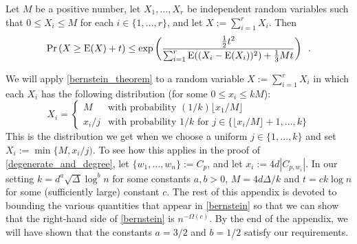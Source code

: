 \documentclass{patmorin}
\begin{document}
\begin{thm}\label{bernstein_theorem}
  Let $M$ be a positive number, let $X_1,\ldots,X_r$ be independent random variables such that $0\le X_i\le M$ for each $i\in\{1,\ldots,r\}$, and let $X:=\sum_{i=1}^r X_i$. Then
  \begin{equation}
    \Pr\left(X \ge \mathrm{E}(X)+ t\right)
      \le \exp\left(\frac{\tfrac{1}{2}t^2}{\sum_{i=1}^r \mathrm{E}((X_i-\mathrm{E}(X_i))^2)+\tfrac{1}{3}Mt}\right) \enspace . \label{bernstein}
  \end{equation}
\end{thm}
We will apply \cref{bernstein_theorem} to a random variable $X:=\sum_{i=1}^r X_i$ in which each $X_i$ has the following distribution (for some $0\le x_i\le kM$):
\[
  X_i = \begin{cases}
          M & \text{with probability $(1/k)\lfloor x_1/M\rfloor$} \\
          x_i/j & \text{with probability $1/k$ for $j\in\{\lfloor x_i/M\rfloor+1,\ldots,k\}$}
        \end{cases}
\]
This is the distribution we get when we choose a uniform $j\in\{1,\ldots,k\}$ and set $X_i:=\min\{M,x_i/j)$.  To see how this applies in the proof of \cref{degenerate_and_degree}, let $\{w_1,\ldots,w_n\}:=C_p$, and let $x_i:=4d|C_{p,w_i}|$.  In our setting $k=d^a\sqrt{\Delta}\log^b n$ for some constants $a,b>0$, $M=4d\Delta/k$ and $t=ck\log n$ for some (sufficiently large) constant $c$.  The rest of this appendix is devoted to bounding the various quantities that appear in \cref{bernstein} so that we can show that the right-hand side of \cref{bernstein} is $n^{-\Omega(c)}$.    By the end of the appendix, we will have shown that the constants $a=3/2$ and $b=1/2$ satisfy our requirements.
\end{document}
